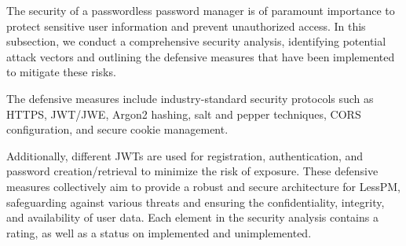 The security of a passwordless password manager is of paramount importance to
protect sensitive user information and prevent unauthorized access.
In this subsection, we conduct a comprehensive security analysis, identifying
potential attack vectors and outlining the defensive measures that have been
implemented to mitigate these risks.

The defensive measures include industry-standard security protocols such as
HTTPS, JWT/JWE, Argon2 hashing, salt and pepper techniques, CORS configuration,
and secure cookie management.

Additionally, different JWTs are used for registration, authentication, and
password creation/retrieval to minimize the risk of exposure.
These defensive measures collectively aim to provide a robust and secure
architecture for LessPM, safeguarding against various threats and ensuring
the confidentiality, integrity, and availability of user data.
Each element in the security analysis contains a rating, as well as a status
on implemented and unimplemented.
